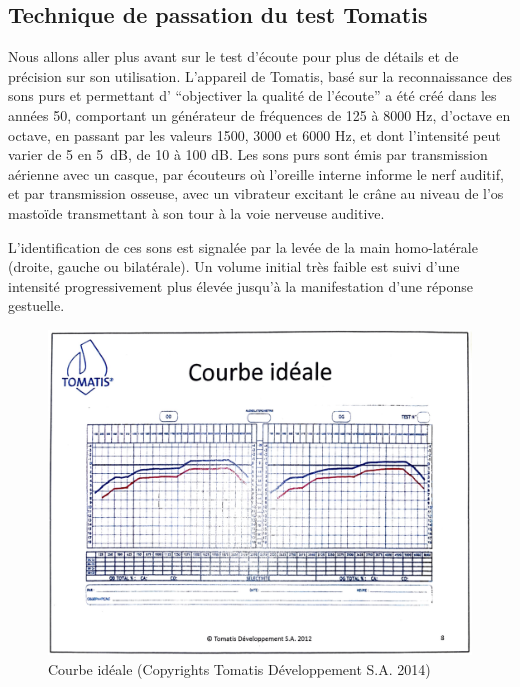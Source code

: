 \subsection{Technique de passation du test Tomatis\textsuperscript \textregistered }
Nous allons aller plus avant sur le test d'écoute pour plus de détails et de précision sur son utilisation.
L'appareil de Tomatis, basé sur la reconnaissance des sons purs 
et permettant d'
\enquote{objectiver la qualité de l'écoute} \autocite [34--35]{Tomatislangage}
 a été créé dans les années 50, comportant un générateur de fréquences
  de 125 à 8000 Hz, d'octave en octave, en passant par les valeurs
1500, 3000 et 6000 Hz, et dont l'intensité peut varier de 5 en \SI{5}{\dB}, de 10 à 100 dB.
Les sons purs sont émis par 
  transmission aérienne avec un casque, par écouteurs où l'oreille interne
  informe le nerf auditif,  et par transmission osseuse,
  avec un vibrateur  excitant le crâne au
  niveau de l'os mastoïde transmettant à son tour à  la voie nerveuse
  auditive.
  
L'identification de ces sons est
  signalée par la levée de la main homo-latérale (droite, gauche ou
  bilatérale).
Un volume initial très faible est suivi d'une intensité
progressivement plus élevée jusqu'à la manifestation d'une réponse gestuelle.




\begin{figure}
	\centering
	\includegraphics[width=0.7
	\linewidth]{images/graphiques/courbeideale.png}
	\caption[Courbe idéale]{Courbe idéale (Copyrights Tomatis Développement S.A.  2014) }
	\label{Courbe idéale}
\end{figure}

